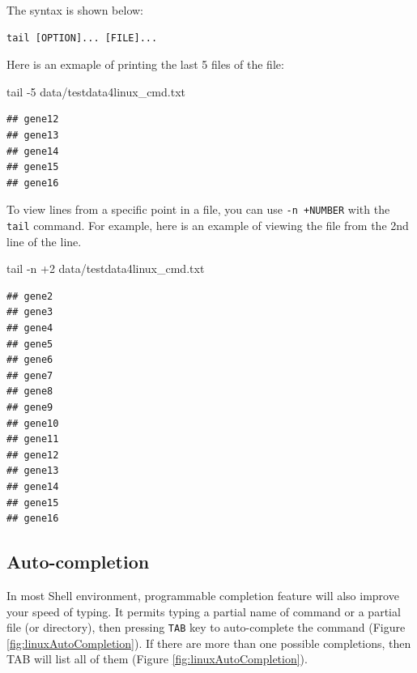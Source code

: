 \documentclass[]{book}
\makeatletter
\newenvironment{Shaded}{\begin{snugshade}}{\end{snugshade}}
\newcommand{\FunctionTok}[1]{\textcolor[rgb]{0.00,0.00,0.00}{#1}}
\newcommand{\NormalTok}[1]{#1}
\newenvironment{kframe}{%
\medskip{}
\setlength{\fboxsep}{.8em}
 \def\at@end@of@kframe{}%
 \ifinner\ifhmode%
  \def\at@end@of@kframe{\end{minipage}}%
  \begin{minipage}{\columnwidth}%
 \fi\fi%
 \def\FrameCommand##1{\hskip\@totalleftmargin \hskip-\fboxsep
 \colorbox{shadecolor}{##1}\hskip-\fboxsep
     \hskip-\linewidth \hskip-\@totalleftmargin \hskip\columnwidth}%
 \MakeFramed {\advance\hsize-\width
   \@totalleftmargin\z@ \linewidth\hsize
   \@setminipage}}%
 {\par\unskip\endMakeFramed%
 \at@end@of@kframe}
\renewenvironment{Shaded}{\begin{kframe}}{\end{kframe}}
\makeatother
\begin{document}
The syntax is shown below:

\begin{verbatim}
tail [OPTION]... [FILE]...
\end{verbatim}

Here is an exmaple of printing the last 5 files of the file:

\begin{Shaded}
\begin{Highlighting}[]
\FunctionTok{tail}\NormalTok{ -5 data/testdata4linux_cmd.txt}
\end{Highlighting}
\end{Shaded}

\begin{verbatim}
## gene12
## gene13
## gene14
## gene15
## gene16
\end{verbatim}

To view lines from a specific point in a file, you can use \texttt{-n\ +NUMBER} with the \texttt{tail} command. For example, here is an example of viewing the file from the 2nd line of the line.

\begin{Shaded}
\begin{Highlighting}[]
\FunctionTok{tail}\NormalTok{ -n +2 data/testdata4linux_cmd.txt}
\end{Highlighting}
\end{Shaded}

\begin{verbatim}
## gene2
## gene3
## gene4
## gene5
## gene6
## gene7
## gene8
## gene9
## gene10
## gene11
## gene12
## gene13
## gene14
## gene15
## gene16
\end{verbatim}

\hypertarget{auto-completion}{%
\subsection{Auto-completion}\label{auto-completion}}

In most Shell environment, programmable completion feature will also improve your speed of typing. It permits typing a partial name of command or a partial file (or directory), then pressing \texttt{TAB} key to auto-complete the command (Figure \ref{fig:linuxAutoCompletion}). If there are more than one possible completions, then TAB will list all of them (Figure \ref{fig:linuxAutoCompletion}).
\end{document}
